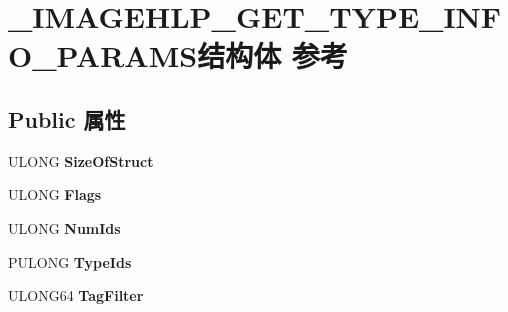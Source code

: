 \hypertarget{struct___i_m_a_g_e_h_l_p___g_e_t___t_y_p_e___i_n_f_o___p_a_r_a_m_s}{}\section{\+\_\+\+I\+M\+A\+G\+E\+H\+L\+P\+\_\+\+G\+E\+T\+\_\+\+T\+Y\+P\+E\+\_\+\+I\+N\+F\+O\+\_\+\+P\+A\+R\+A\+M\+S结构体 参考}
\label{struct___i_m_a_g_e_h_l_p___g_e_t___t_y_p_e___i_n_f_o___p_a_r_a_m_s}
\subsection*{Public 属性}
\begin{DoxyCompactItemize}
\item 
\mbox{\label{struct___i_m_a_g_e_h_l_p___g_e_t___t_y_p_e___i_n_f_o___p_a_r_a_m_s_a15591f33d724cb7e554a40c0a3fb0c3d}} 
U\+L\+O\+NG {\bfseries Size\+Of\+Struct}
\item 
\mbox{\label{struct___i_m_a_g_e_h_l_p___g_e_t___t_y_p_e___i_n_f_o___p_a_r_a_m_s_aaa6a1c2b8e3cbc09893627a11015876b}} 
U\+L\+O\+NG {\bfseries Flags}
\item 
\mbox{\label{struct___i_m_a_g_e_h_l_p___g_e_t___t_y_p_e___i_n_f_o___p_a_r_a_m_s_a88c99af11d87a5f023ecd5bee57669d6}} 
U\+L\+O\+NG {\bfseries Num\+Ids}
\item 
\mbox{\label{struct___i_m_a_g_e_h_l_p___g_e_t___t_y_p_e___i_n_f_o___p_a_r_a_m_s_a089d0afddf49c847fa3cf5dd7e297955}} 
P\+U\+L\+O\+NG {\bfseries Type\+Ids}
\item 
\mbox{\label{struct___i_m_a_g_e_h_l_p___g_e_t___t_y_p_e___i_n_f_o___p_a_r_a_m_s_ab1dd7a917474ed81f6a4186d78510c60}} 
U\+L\+O\+N\+G64 {\bfseries Tag\+Filter}
\item 
\mbox{\label{struct___i_m_a_g_e_h_l_p___g_e_t___t_y_p_e___i_n_f_o___p_a_r_a_m_s_aa093633d5550aef72ec9b0b2cea77cbf}} 

\end{DoxyCompactItemize}
